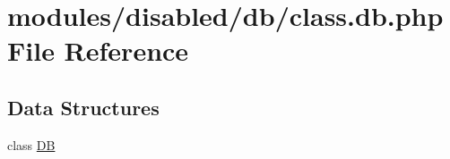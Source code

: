 \hypertarget{class_8db_8php}{\section{modules/disabled/db/class.db.\-php File Reference}
\label{class_8db_8php}
}
\subsection*{Data Structures}
\begin{DoxyCompactItemize}
\item 
class \hyperlink{class_d_b}{D\-B}
\end{DoxyCompactItemize}
